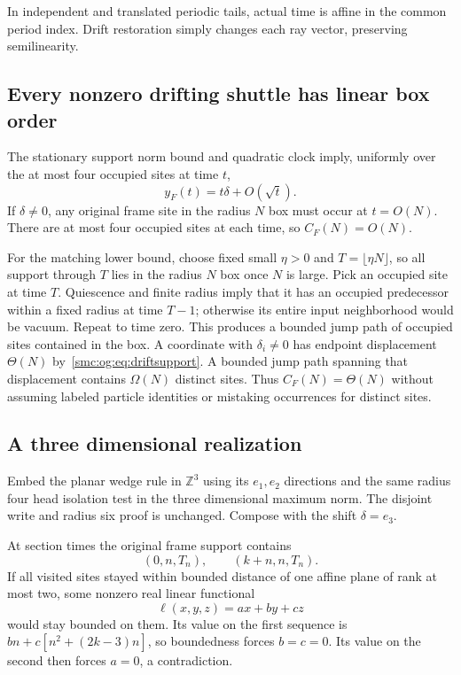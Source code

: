 \documentclass[11pt,letterpaper]{article}
\numberwithin{equation}{section}
\theoremstyle{definition}
\theoremstyle{remark}
\newcommand{\Z}{\mathbb Z}
\begin{document}
In independent and translated periodic tails, actual time is affine in the common period index. Drift restoration simply changes each ray vector, preserving semilinearity.

\subsection{Every nonzero drifting shuttle has linear box order}
The stationary support norm bound and quadratic clock imply, uniformly over the at most four occupied sites at time $t$,
\begin{equation}\label{smc:og:eq:driftsupport}
 y_F(t)=t\delta+O(\sqrt t).
\end{equation}
If $\delta\ne0$, any original frame site in the radius $N$ box must occur at $t=O(N)$. There are at most four occupied sites at each time, so $C_F(N)=O(N)$.

For the matching lower bound, choose fixed small $\eta>0$ and $T=\lfloor\eta N\rfloor$, so all support through $T$ lies in the radius $N$ box once $N$ is large. Pick an occupied site at time $T$. Quiescence and finite radius imply that it has an occupied predecessor within a fixed radius at time $T-1$; otherwise its entire input neighborhood would be vacuum. Repeat to time zero. This produces a bounded jump path of occupied sites contained in the box. A coordinate with $\delta_i\ne0$ has endpoint displacement $\Theta(N)$ by~\eqref{smc:og:eq:driftsupport}. A bounded jump path spanning that displacement contains $\Omega(N)$ distinct sites. Thus $C_F(N)=\Theta(N)$ without assuming labeled particle identities or mistaking occurrences for distinct sites.

\subsection{A three dimensional realization}
Embed the planar wedge rule in $\Z^3$ using its $e_1,e_2$ directions and the same radius four head isolation test in the three dimensional maximum norm. The disjoint write and radius six proof is unchanged. Compose with the shift $\delta=e_3$.

At section times the original frame support contains
\[
 (0,n,T_n),\qquad (k+n,n,T_n).
\]
If all visited sites stayed within bounded distance of one affine plane of rank at most two, some nonzero real linear functional
\[
 \ell(x,y,z)=ax+by+cz
\]
would stay bounded on them. Its value on the first sequence is $bn+c[n^2+(2k-3)n]$, so boundedness forces $b=c=0$. Its value on the second then forces $a=0$, a contradiction.
\end{document}
